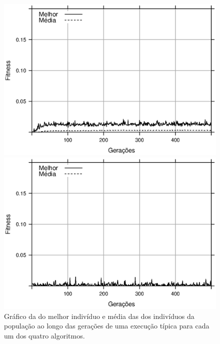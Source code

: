 \begin{figure}[h]
    \begin{minipage}{.5\textwidth}
        \includegraphics[width=\textwidth]{figures/fitness-PSO}
    \end{minipage}%
    \begin{minipage}{.5\textwidth}
        \includegraphics[width=\textwidth]{figures/fitness-DPSO}
    \end{minipage}

    \caption{Gráfico da \fitness do melhor indivíduo e média das \fitnessp dos indivíduos da população ao longo das gerações de uma execução típica para cada um dos quatro algoritmos.}
    \label{fig:fitness-gen}
\end{figure}

